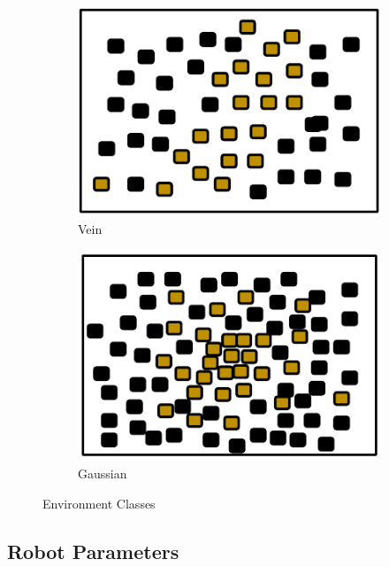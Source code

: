 \begin{figure} [h]
\begin{subfigure}[b]{0.2\textwidth}
                \includegraphics[width=\textwidth]{chapters/chapter4/figures/veinenv.pdf}
                \caption{Vein}
                \label{fig:veinenv}
        \end{subfigure}  
        \begin{subfigure}[b]{0.2\textwidth}
                        \includegraphics[width=\textwidth]{chapters/chapter4/figures/gaussianenv}
                        \caption{Gaussian}
                        \label{fig:gaussianenv}
       \end{subfigure}
        \caption{Environment Classes}\label{fig:environments}
\end{figure}


\subsection{Robot Parameters}
\label{parameters}

